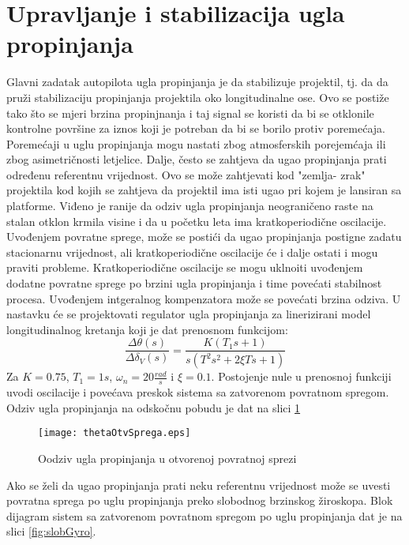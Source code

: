 \section{Upravljanje i stabilizacija ugla propinjanja}
Glavni zadatak autopilota ugla propinjanja je da stabilizuje projektil, tj. da 
da pruži stabilizaciju propinjanja projektila oko longitudinalne ose. Ovo se postiže tako 
što se mjeri brzina propinjnanja i taj signal se koristi da bi se otklonile 
kontrolne površine za iznos koji je potreban da bi se borilo protiv poremećaja. 
Poremećaji u uglu propinjanja mogu nastati zbog atmosferskih porejemćaja ili 
zbog asimetričnosti letjelice. Dalje, često se zahtjeva da ugao propinjanja prati 
određenu referentnu vrijednost. Ovo se može zahtjevati kod "zemlja- zrak" projektila 
kod kojih se zahtjeva da projektil ima isti ugao pri kojem je lansiran sa platforme. 
Viđeno je ranije da odziv ugla propinjanja neograničeno raste na stalan otklon krmila visine 
i da u početku leta ima kratkoperiodične oscilacije. Uvođenjem povratne sprege,
može se postići da ugao propinjanja postigne zadatu stacionarnu vrijednost, ali kratkoperiodične 
oscilacije će i dalje ostati i mogu praviti probleme. Kratkoperiodične 
oscilacije se mogu uklnoiti uvođenjem dodatne povratne sprege po brzini ugla propinjanja 
i time povećati stabilnost procesa. Uvođenjem intgeralnog kompenzatora može se povećati brzina odziva.
U nastavku će se projektovati regulator ugla propinjanja za linerizirani model longitudinalnog kretanja 
koji je dat prenosnom funkcijom:
\begin{equation}
    \frac{\Delta \theta(s)}{\Delta \delta_V(s)}=\frac{K(T_1s+1)}{s(T^2s^2+2\xi Ts+1)}
\end{equation}
Za $K=0.75$, $T_1 = 1s$, $\omega _n = 20 \frac{rad}{s}$ i $\xi = 0.1$. 
Postojenje nule u prenosnoj funkciji uvodi oscilacije i povećava preskok sistema sa 
zatvorenom povratnom spregom. Odziv ugla propinjanja na odskočnu pobudu  je dat na 
slici \ref{fig:propinj}
\begin{figure}[!ht]
    \centering
    \texttt{[image: thetaOtvSprega.eps]}
    \caption{Oodziv ugla propinjanja u otvorenoj povratnoj sprezi}
    \label{fig:propinj}
\end{figure} 
Ako se želi da ugao propinjanja prati neku referentnu vrijednost može se uvesti 
povratna sprega po uglu propinjanja preko slobodnog brzinskog žiroskopa. Blok dijagram sistem sa zatvorenom 
povratnom spregom po uglu propinjanja dat je na slici \ref{fig:slobGyro}.
